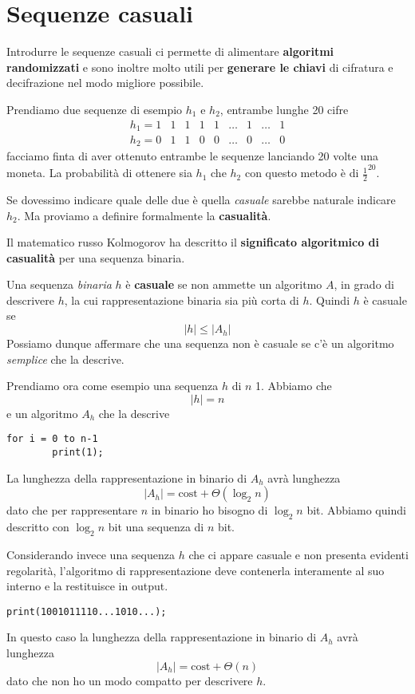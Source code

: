 \chapter{Sequenze casuali}\label{casualita}
Introdurre le sequenze casuali ci permette di alimentare \textbf{algoritmi randomizzati} e sono inoltre molto utili
per \textbf{generare le chiavi} di cifratura e decifrazione nel modo migliore possibile.

Prendiamo due sequenze di esempio $h_1$ e $h_2$, entrambe lunghe 20 cifre
\[
	\begin{matrix}
		h_1 = 1 & 1 & 1 & 1 & 1 & \dots & 1 & \dots & 1 \\
		h_2 = 0 & 1 & 1 & 0 & 0 & \dots & 0 & \dots & 0
	\end{matrix}
\]
facciamo finta di aver ottenuto entrambe le sequenze lanciando 20 volte una moneta. La probabilit\`a di ottenere sia
$h_1$ che $h_2$ con questo metodo \`e di $\frac{1}{2}^{20}$.

Se dovessimo indicare quale delle due \`e quella \emph{casuale} sarebbe naturale indicare $h_2$. Ma proviamo a definire
formalmente la \textbf{casualit\`a}.

Il matematico russo Kolmogorov ha descritto il \textbf{significato algoritmico di casualit\`a} per una sequenza binaria.

\begin{definition}[Kolmogorov]
	Una sequenza \emph{binaria} $h$ \`e \textbf{casuale} se non ammette un algoritmo $A$, in grado di descrivere $h$, la
	cui rappresentazione binaria sia pi\`u corta di $h$. Quindi $h$ \`e casuale se
	\[ |h| \leq |A_h| \]
	Possiamo dunque affermare che una sequenza non \`e casuale se c'\`e un algoritmo \emph{semplice} che la descrive.
\end{definition}

\begin{example}
	Prendiamo ora come esempio una sequenza $h$ di $n$ 1. Abbiamo che
	\[ |h| = n \]
	e un algoritmo $A_h$ che la descrive
	\begin{lstlisting}[style=pseudo-style]
	for i = 0 to n-1
		print(1);
	\end{lstlisting}
	La lunghezza della rappresentazione in binario di $A_h$ avr\`a lunghezza
	\[ |A_h| = \text{cost} + \Theta(\log_2 n) \]
	dato che per rappresentare $n$ in binario ho bisogno di $\log_2 n$ bit. Abbiamo quindi descritto con $\log_2 n$	bit
	una sequenza di $n$ bit.
\end{example}

\begin{example}
	Considerando invece una sequenza $h$ che ci appare casuale e non presenta evidenti regolarit\`a, l'algoritmo di
	rappresentazione deve contenerla interamente al suo interno e la restituisce in output.
	\begin{lstlisting}[style=pseudo-style]
	print(1001011110...1010...);
	\end{lstlisting}
	In questo caso la lunghezza della rappresentazione in binario di $A_h$ avr\`a lunghezza
	\[ |A_h| = \text{cost} + \Theta(n) \]
	dato che non ho un modo compatto per descrivere $h$.
\end{example}

